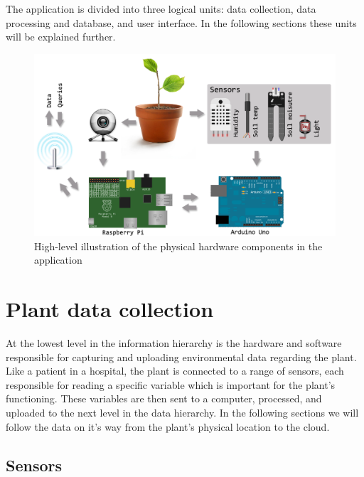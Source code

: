 The application is divided into three logical units: data collection, data processing and database, and user interface. In the following sections these units will be explained further. 

\begin{figure}
\centering
\includegraphics[width=1\textwidth]{img/hardware/application.png}
\caption{High-level illustration of the physical hardware components in the application}
\label{fig:application}
\end{figure}

\section{Plant data collection}
At the lowest level in the information hierarchy is the hardware and software responsible for capturing and uploading environmental data regarding the plant. Like a patient in a hospital, the plant is connected to a range of sensors, each responsible for reading a specific variable which is important for the plant’s functioning. These variables are then sent to a computer, processed, and uploaded to the next level in the data hierarchy. In the following sections we will follow the data on it’s way from the plant’s physical location to the cloud.

\subsection{Sensors}

